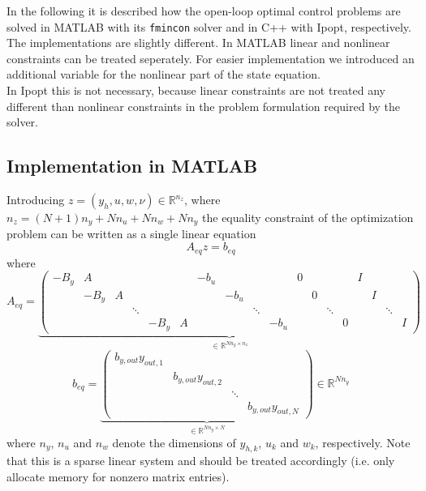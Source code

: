 \documentclass[
12pt, %
a4paper, %
onecolumn, %
portrait %
]{article}
\begin{document}
In the following it is described how the open-loop optimal control problems are solved in MATLAB with its \texttt{fmincon} solver and in C++ with Ipopt, respectively. The implementations are slightly different. In MATLAB linear and nonlinear constraints can be treated seperately. For easier implementation we introduced an additional variable for the nonlinear part of the state equation.\\
In Ipopt this is not necessary, because linear constraints are not treated any different than nonlinear constraints in the problem formulation required by the solver.
\subsection{Implementation in MATLAB}
Introducing $z = (y_h, u, w, \nu) \in \mathbb{R}^{n_z}$, where $n_z = (N+1)n_y + N n_u  + N n_w + N n_y$ the equality constraint of the optimization problem can be written as a single linear equation 
\begin{equation}
A_{eq} z = b_{eq}
\label{eq:matlab-linear-system-constraints}
\end{equation}
where
\begin{equation}
A_{eq} =
\underbrace{\begin{pmatrix}
-B_y &    A &   &        & 		 &   & -b_u &      &        &      & 0 &   &       &   & I &   &        & \\
     & -B_y & A &        & 		 &   &      & -b_u &        &      &   & 0 &       &   &   & I &        & \\
     &      &   & \ddots &      &   &      &      & \ddots & 	    &   &   &\ddots &   &   &   & \ddots & \\
     &      &   &        & -B_y & A &      &      &        & -b_u &   &   &       & 0 &   &   &        & I 
\end{pmatrix}}_{
\in \mathbb{R}^{N n_y \times n_z}}
\end{equation}
\begin{equation}
b_{eq} = 
\underbrace{\begin{pmatrix}
b_{y,out}y_{out,1} & & & \\
& b_{y,out}y_{out,2} & &  \\
& & \ddots & \\
& & & b_{y,out}y_{out,N}
\end{pmatrix}}_{
\in \mathbb{R}^{N n_y \times N}
}
  \in \mathbb{R}^{N n_y}
\end{equation}
where $n_y$, $n_u$ and $n_w$ denote the dimensions of $y_{h,k}$, $u_k$ and $w_k$, respectively.
Note that this is a sparse linear system and should be treated accordingly (i.e. only allocate memory for nonzero matrix entries).
\end{document}
